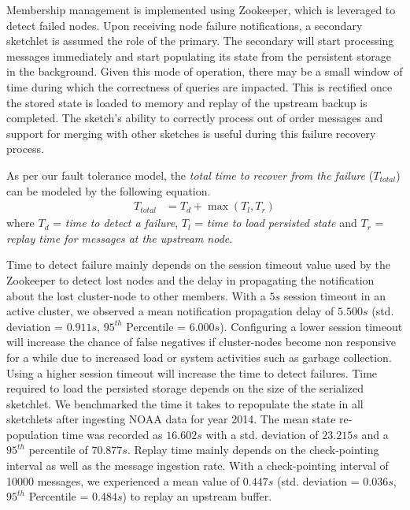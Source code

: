 Membership management is implemented using Zookeeper, which is leveraged to detect failed nodes.
Upon receiving node failure notifications, a secondary sketchlet is assumed the role of the primary.
The secondary will start processing messages immediately and start populating its state from the persistent storage in the background.
Given this mode of operation, there may be a small window of time during which the correctness of queries are impacted.
This is rectified once the stored state is loaded to memory and replay of the upstream backup is completed.
The sketch's ability to correctly process out of order messages and support for merging with other sketches is useful during this failure recovery process.

As per our fault tolerance model, the \textit{total time to recover from the failure} ($T_{total}$) can be modeled by the following equation.
\begin{align*}
    T_{total} &= T_{d} + \max{(T_{l}, T_{r})}      
\end{align*}
where $T_{d}$ = \textit{time to detect a failure}, $T_{l}$ = \textit{time to load persisted state} and $T_{r}$ = \textit{replay time for messages at the upstream node}.

Time to detect failure mainly depends on the session timeout value used by the Zookeeper to detect lost nodes and the delay in propagating the notification about the lost cluster-node to other members. With a $5s$ session timeout in an active cluster, we observed a mean notification propagation delay of $5.500s$ (std. deviation = $0.911s$, $95^{th}$ Percentile = $6.000s$). Configuring a lower session timeout will increase the chance of false negatives if cluster-nodes become non responsive for a while due to increased load or system activities such as garbage collection. Using a higher session timeout will increase the time to detect failures. Time required to load the persisted storage depends on the size of the serialized sketchlet. We benchmarked the time it takes to repopulate the state in all sketchlets after ingesting NOAA data for year 2014. The mean state re-population time was recorded as $16.602s$ with a std. deviation of $23.215s$ and a $95^{th}$ percentile of $70.877s$. Replay time mainly depends on the check-pointing interval as well as the message ingestion rate. With a check-pointing interval of 10000 messages, we experienced a mean value of $0.447s$ (std. deviation = $0.036s$, $95^{th}$ Percentile = $0.484s$) to replay an upstream buffer.  														



